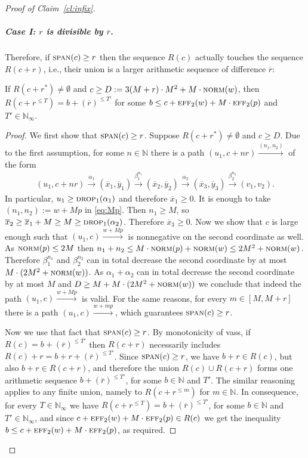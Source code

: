 \documentclass[a4paper, UKenglish, cleveref, autoref, thm-restate]{lipics-v2021}
\newcommand{\N}{\mathbb{N}}
\newcommand{\trans}[1]{\stackrel{#1}{\longrightarrow}}
\newcommand{\norm}{\textsc{norm}}
\newcommand{\spn}{\textsc{span}}
\newcommand{\eff}{\textsc{eff}}
\newcommand{\drop}{\textsc{drop}}
\newcommand{\vass}{{\sc vass}\xspace}
\newcommand{\para}[1]{\vspace{-3mm}\subparagraph*{\bf #1.}}
\newcommand{\essdvass}[1]{\overline{#1}}
\begin{document}
\begin{appendixproof}
\begin{proof}[Proof of Claim~\ref{cl:infix}]
\para{Case I: $r$ is divisible by $\essdvass r$}

Therefore, if $\spn(c) \geq r$ then the sequence $R(c)$ actually touches the sequence $R(c+r)$,
i.e., their union is a larger arithmetic sequence of difference $\essdvass r$:

\begin{claim}\label{cl:merged}
If $R(c+r^*) \neq \emptyset$ and $c \geq D:= 3(M+r) \cdot M^2 + M \cdot \norm(w)$,
then $R(c+r^{\leq T}) = b+(\essdvass r)^{\leq T'}$ for some $b \leq c + \eff_2(w) + M \cdot \eff_2(p)$ and $T' \in \N_\infty$.
\end{claim}

\begin{proof}
We first show that $\spn(c) \geq r$.
Suppose $R(c+r^*) \neq \emptyset$ and $c \geq D$.
Due to the first assumption,  for some $n\in\N$ there is a path $(u_1, c+nr) \trans{(n_1, n_2)}$
of the form
\begin{align} \label{eq:Mp}
(u_1, c+nr) \trans{\alpha_1} (\essdvass{x}_1, \essdvass{y}_1) \trans{\beta_1^{n_1}} (\essdvass{x}_2, \essdvass{y}_2) \trans{\alpha_2} (\essdvass{x}_3, \essdvass{y}_3) \trans{\beta_2^{n_2}} (v_1, v_2).
\end{align}
In particular,  $u_1 \geq \drop_1(\alpha_1)$
and therefore $\essdvass x_1\geq 0$.
It is enough to take $(n_1, n_2) := w + Mp$ in \eqref{eq:Mp}.
Then $n_1 \geq M$, so $\essdvass x_2 \geq \essdvass x_1 + M \geq M \geq \drop_1(\alpha_2)$.
Therefore $\essdvass x_3\geq 0$.
Now we show that $c$ is large enough such that $(u_1, c) \trans{w+Mp}$ is nonnegative on the second coordinate as well.
As $\norm(p) \leq 2M$ then $n_1 + n_2 \leq M \cdot \norm(p) + \norm(w) \leq 2M^2 + \norm(w)$. Therefore
$\beta_1^{n_1}$ and $\beta_2^{n_2}$ can in total decrease the second coordinate by at most $M \cdot (2M^2 + \norm(w))$.
As $\alpha_1 + \alpha_2$ can in total decrease the second coordinate by at most $M$ and
$D \geq M + M \cdot (2M^2 + \norm(w))$ we conclude that indeed the path $(u_1, c) \trans{w+Mp}$ is valid.
For the same reasons, for every $m\in [M, M+r]$ there is a path $(u_1, c) \trans{w+mp}$, which guarantees $\spn(c) \geq r$. 

Now we use that fact that $\spn(c) \geq r$.
By monotonicity of \vass, if $R(c) = b+(\essdvass r)^{\leq {T'}}$
then $R(c+r)$ necessarily includes $R(c) + r= b+r+(\essdvass r)^{\leq {T'}}$.
Since $\spn(c) \geq r$, we have $b+r \in R(c)$, but also $b+r \in R(c+r)$,
and therefore the union $R(c) \cup R(c + r)$ forms one arithmetic sequence 
$b+(\essdvass r)^{\leq T'}$, for some $b\in\N$ and $T'$.
The similar reasoning applies to any finite union, namely to $R(c+r^{\leq m})$ for $m\in\N$.
In consequence, for every $T\in \N_\infty$ we have $R(c+r^{\leq T}) = b + (\essdvass r)^{\leq T'}$,
for some $b\in\N$ and $T'\in \N_\infty$,
and since $c+ \eff_2(w) + M \cdot \eff_2(p) \in R(c)$ we get the inequality $b \leq c + \eff_2(w) + M \cdot \eff_2(p)$, as required.
\end{proof}


\end{proof}
\end{appendixproof}
\end{document}
